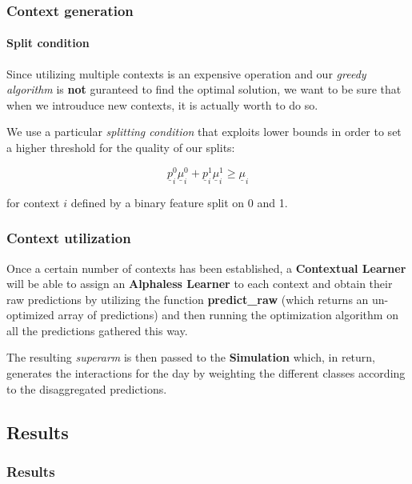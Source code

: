 \begin{frame}

\frametitle{Context generation}
\framesubtitle{Split condition}

Since utilizing multiple contexts is an expensive operation and our \textit{greedy algorithm} is \textbf{not} guranteed to find the optimal solution, we want to be sure that when we introuduce new contexts, it is actually worth to do so.

We use a particular \textit{splitting condition} that exploits lower bounds in order to set a higher threshold for the quality of our splits:

\begin{Large}
    \begin{displaymath}
        \underline{p}_i^0 \underline{\mu}_i^0 + \underline{p}_i^1 \underline{\mu}_i^1 \geq \underline{\mu}_i
    \end{displaymath}
\end{Large}

for context $i$ defined by a binary feature split on 0 and 1.

\end{frame}


\begin{frame}

\frametitle{Context utilization}

Once a certain number of contexts has been established, a \textbf{Contextual Learner} will be able to assign an \textbf{Alphaless Learner} to each context and obtain their raw predictions by utilizing the function \textbf{predict\_raw} (which returns an un-optimized array of predictions) and then running the optimization algorithm on all the predictions gathered this way.

The resulting \textit{superarm} is then passed to the \textbf{Simulation} which, in return, generates the interactions for the day by weighting the different classes according to the disaggregated predictions.

\end{frame}


\subsection{Results}


\begin{frame}

\frametitle{Results}
\framesubtitle{}


\end{frame}

